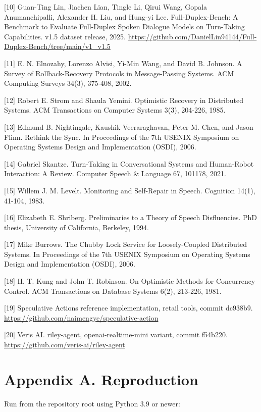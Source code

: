 \documentclass[11pt]{article}
\begin{document}
[10] Guan-Ting Lin, Jiachen Lian, Tingle Li, Qirui Wang, Gopala Anumanchipalli, Alexander H. Liu, and Hung-yi Lee. Full-Duplex-Bench: A Benchmark to Evaluate Full-Duplex Spoken Dialogue Models on Turn-Taking Capabilities. v1.5 dataset release, 2025. \url{https://github.com/DanielLin94144/Full-Duplex-Bench/tree/main/v1_v1.5}


[11] E. N. Elnozahy, Lorenzo Alvisi, Yi-Min Wang, and David B. Johnson. A Survey of Rollback-Recovery Protocols in Message-Passing Systems. ACM Computing Surveys 34(3), 375-408, 2002.


[12] Robert E. Strom and Shaula Yemini. Optimistic Recovery in Distributed Systems. ACM Transactions on Computer Systems 3(3), 204-226, 1985.


[13] Edmund B. Nightingale, Kaushik Veeraraghavan, Peter M. Chen, and Jason Flinn. Rethink the Sync. In Proceedings of the 7th USENIX Symposium on Operating Systems Design and Implementation (OSDI), 2006.


[14] Gabriel Skantze. Turn-Taking in Conversational Systems and Human-Robot Interaction: A Review. Computer Speech \& Language 67, 101178, 2021.


[15] Willem J. M. Levelt. Monitoring and Self-Repair in Speech. Cognition 14(1), 41-104, 1983.


[16] Elizabeth E. Shriberg. Preliminaries to a Theory of Speech Disfluencies. PhD thesis, University of California, Berkeley, 1994.


[17] Mike Burrows. The Chubby Lock Service for Loosely-Coupled Distributed Systems. In Proceedings of the 7th USENIX Symposium on Operating Systems Design and Implementation (OSDI), 2006.


[18] H. T. Kung and John T. Robinson. On Optimistic Methods for Concurrency Control. ACM Transactions on Database Systems 6(2), 213-226, 1981.


[19] Speculative Actions reference implementation, retail tools, commit dc938b9. \url{https://github.com/naimengye/speculative-action}


[20] Veris AI. riley-agent, openai-realtime-mini variant, commit f54b220. \url{https://github.com/veris-ai/riley-agent}


\section*{Appendix A. Reproduction}

Run from the repository root using Python 3.9 or newer:
\end{document}

